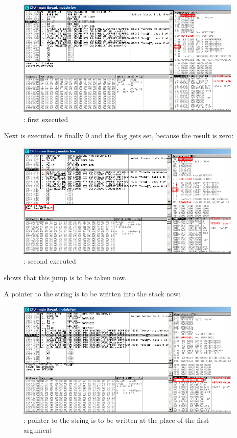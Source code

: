 \begin{figure}[H]
\centering
\includegraphics[scale=\FigScale]{patterns/08_switch/1_few/olly3.png}
\caption{\olly: first \DEC executed}
\label{fig:switch_few_olly3}
\end{figure}

\clearpage
Next \DEC is executed. 
\EAX is finally 0 and the \ZF flag gets set, because the result is zero:

\begin{figure}[H]
\centering
\includegraphics[scale=\FigScale]{patterns/08_switch/1_few/olly4.png}
\caption{\olly: second \DEC executed}
\label{fig:switch_few_olly4}
\end{figure}

\olly shows that this jump is to be taken now.

\clearpage
A pointer to the string  is to be written into the stack now:

\begin{figure}[H]
\centering
\includegraphics[scale=\FigScale]{patterns/08_switch/1_few/olly5.png}
\caption{\olly: 
pointer to the string is to be written at the place of the first argument}
\label{fig:switch_few_olly5}
\end{figure}

